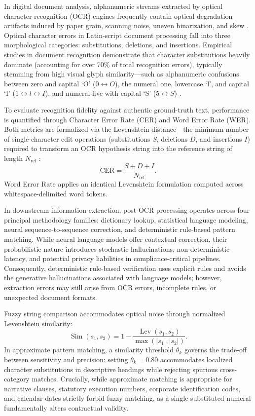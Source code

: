 In digital document analysis, alphanumeric streams extracted by optical character recognition (OCR) engines frequently contain optical degradation artifacts induced by paper grain, scanning noise, uneven binarization, and skew \cite{ref20, ref22}.
Optical character errors in Latin-script document processing fall into three morphological categories: substitutions, deletions, and insertions.
Empirical studies in document recognition demonstrate that character substitutions heavily dominate (accounting for over 70\% of total recognition errors), typically stemming from high visual glyph similarity---such as alphanumeric confusions between zero and capital `O' ($0 \leftrightarrow O$), the numeral one, lowercase `l', and capital `I' ($1 \leftrightarrow l \leftrightarrow I$), and numeral five with capital `S' ($5 \leftrightarrow S$) \cite{docxa4}.

To evaluate recognition fidelity against authentic ground-truth text, performance is quantified through Character Error Rate (CER) and Word Error Rate (WER).
Both metrics are formalized via the Levenshtein distance---the minimum number of single-character edit operations (substitutions $S$, deletions $D$, and insertions $I$) required to transform an OCR hypothesis string into the reference string of length $N_{\text{ref}}$ \cite{docxa5}:
\begin{equation}
\label{eq:theory_cer}
\mathrm{CER} = \frac{S + D + I}{N_{\text{ref}}}.
\end{equation}
Word Error Rate applies an identical Levenshtein formulation computed across whitespace-delimited word tokens.

In downstream information extraction, post-OCR processing operates across four principal methodology families: dictionary lookup, statistical language modeling, neural sequence-to-sequence correction, and deterministic rule-based pattern matching.
While neural language models offer contextual correction, their probabilistic nature introduces stochastic hallucinations, non-deterministic latency, and potential privacy liabilities in compliance-critical pipelines.
Consequently, deterministic rule-based verification uses explicit rules and avoids the generative hallucinations associated with language models; however, extraction errors may still arise from OCR errors, incomplete rules, or unexpected document formats.

Fuzzy string comparison accommodates optical noise through normalized Levenshtein similarity:
\begin{equation}
\label{eq:theory_levenshtein_similarity}
\operatorname{Sim}(s_1, s_2) = 1 - \frac{\operatorname{Lev}(s_1, s_2)}{\max(|s_1|, |s_2|)}.
\end{equation}
In approximate pattern matching, a similarity threshold $\theta_k$ governs the trade-off between sensitivity and precision: setting $\theta_k = 0.80$ accommodates localized character substitutions in descriptive headings while rejecting spurious cross-category matches.
Crucially, while approximate matching is appropriate for narrative clauses, statutory execution numbers, corporate identification codes, and calendar dates strictly forbid fuzzy matching, as a single substituted numeral fundamentally alters contractual validity.

